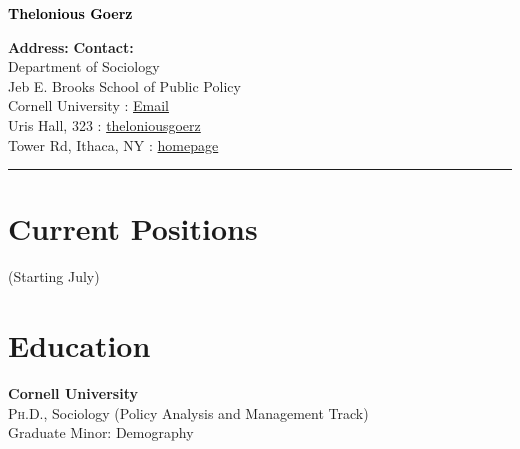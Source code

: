 \documentclass[11pt]{article} %
\begin{document}

{\Huge\bfseries \textcolor{black}{Thelonious Goerz}} \\
\bigskip 

\textbf{Address:} \hfill \textbf{Contact:} \\
Department of Sociology \\
Jeb E. Brooks School of Public Policy \\ 
Cornell University \hfill {} : \href{mailto:theloniouslgoerz@gmail.com}{Email}\\ %
Uris Hall, 323  \hfill {} : \href{https://github.com/theloniousgoerz/}{theloniousgoerz}\\ %
Tower Rd, Ithaca, NY \hfill {} : \href{theloniousgoerz.github.io}{homepage} \\
\noindent\rule{16cm}{0.4pt}

\vspace{0.001\textheight} %





\section*{Current Positions}


 (Starting July)

\section*{Education}
 
  \textbf{Cornell University} \\
 \textsc{Ph.D.}, Sociology (Policy Analysis and Management Track)\\
	Graduate Minor: Demography
 
\end{document}

